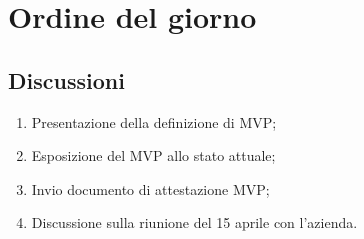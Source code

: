 \section{Ordine del giorno} \label{sec:agenda}
\subsection{Discussioni} \label{subsec:discussione}
\begin{enumerate}

    \item Presentazione della definizione di MVP;
    \item Esposizione del MVP allo stato attuale;
    \item Invio documento di attestazione MVP;
    \item Discussione sulla riunione del 15 aprile con l'azienda.
    
\end{enumerate}

